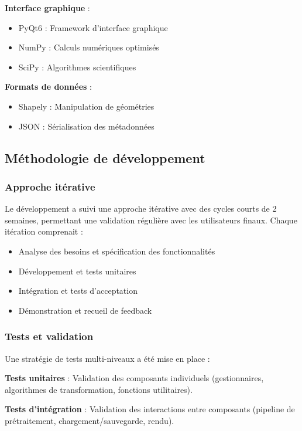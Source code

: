 \documentclass[12pt,a4paper]{report}
\begin{document}
\begin{}
\begin{}
\begin{}
\begin{}
\textbf{Interface graphique} :
\begin{itemize}
\item PyQt6 : Framework d'interface graphique
\item NumPy : Calculs numériques optimisés
\item SciPy : Algorithmes scientifiques
\end{itemize}

\textbf{Formats de données} :
\begin{itemize}
\item Shapely : Manipulation de géométries
\item JSON : Sérialisation des métadonnées
\end{itemize}

\subsection{Méthodologie de développement}

\subsubsection{Approche itérative}

Le développement a suivi une approche itérative avec des cycles courts de 2 semaines, permettant une validation régulière avec les utilisateurs finaux. Chaque itération comprenait :
\begin{itemize}
\item Analyse des besoins et spécification des fonctionnalités
\item Développement et tests unitaires
\item Intégration et tests d'acceptation
\item Démonstration et recueil de feedback
\end{itemize}

\subsubsection{Tests et validation}

Une stratégie de tests multi-niveaux a été mise en place :

\textbf{Tests unitaires} : Validation des composants individuels (gestionnaires, algorithmes de transformation, fonctions utilitaires).

\textbf{Tests d'intégration} : Validation des interactions entre composants (pipeline de prétraitement, chargement/sauvegarde, rendu).


\end{}
\end{}
\end{}
\end{}
\end{document}

